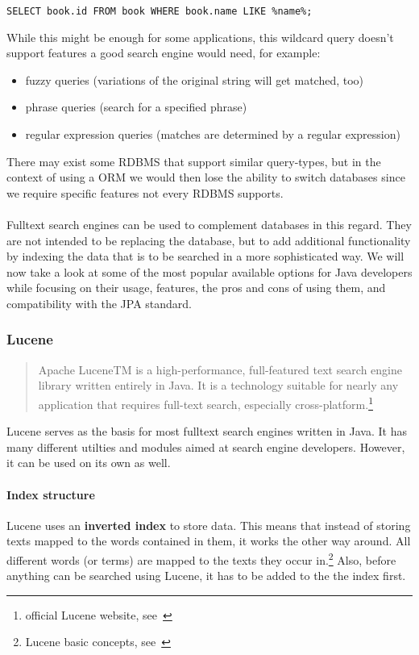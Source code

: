 \lstset{language=sql}
\begin{lstlisting}[frame=htrbl, label={lst:result2}]
SELECT book.id FROM book WHERE book.name LIKE %name%;
\end{lstlisting}
While this might be enough for some applications, this wildcard query doesn't support features a good search engine would need, for example:

\begin{itemize}
	\item fuzzy queries (variations of the original string will get matched, too)
	\item phrase queries (search for a specified phrase)
	\item regular expression queries (matches are determined by a regular expression)
\end{itemize}
There may exist some RDBMS that support similar query-types, but in the context of using a ORM we would then lose the ability to switch databases since we require specific features not every RDBMS supports.
\\\\
Fulltext search engines can be used to complement databases in this regard. They are not intended to be replacing the database, but to add additional functionality by indexing the data that is to be searched in a more sophisticated way. We will now take a look at some of the most popular available options for Java developers while focusing on their usage, features, the pros and cons of using them, and compatibility with the JPA standard.

\subsubsection{Lucene}

\begin{quote}
Apache LuceneTM is a high-performance, full-featured text search engine library written entirely in Java. It is a technology suitable for nearly any application that requires full-text search, especially cross-platform.\footnote{official Lucene website, see~\cite{lucene_apache_org}}
\end{quote}
Lucene serves as the basis for most fulltext search engines written in Java. It has many different utilties and modules aimed at search engine developers. However, it can be used on its own as well.

\paragraph{Index structure}
Lucene uses an \textbf{inverted index} to store data. This means that instead of storing texts mapped to the words contained in them, it works the other way around. All different words (or terms) are mapped to the texts they occur in.\footnote{Lucene basic concepts, see~\cite{lucene_basic_concepts}} Also, before anything can be searched using Lucene, it has to be added to the the index first.

